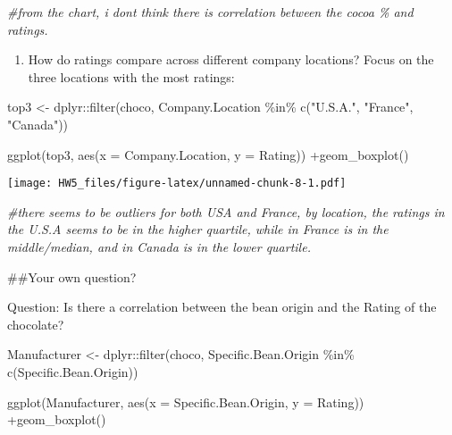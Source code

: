 \documentclass[
]{article}
\newenvironment{Shaded}{\begin{snugshade}}{\end{snugshade}}
\newcommand{\AttributeTok}[1]{\textcolor[rgb]{0.77,0.63,0.00}{#1}}
\newcommand{\CommentTok}[1]{\textcolor[rgb]{0.56,0.35,0.01}{\textit{#1}}}
\newcommand{\FunctionTok}[1]{\textcolor[rgb]{0.00,0.00,0.00}{#1}}
\newcommand{\NormalTok}[1]{#1}
\newcommand{\OtherTok}[1]{\textcolor[rgb]{0.56,0.35,0.01}{#1}}
\newcommand{\SpecialCharTok}[1]{\textcolor[rgb]{0.00,0.00,0.00}{#1}}
\newcommand{\StringTok}[1]{\textcolor[rgb]{0.31,0.60,0.02}{#1}}
\providecommand{\tightlist}{%
  \setlength{\itemsep}{0pt}\setlength{\parskip}{0pt}}
\begin{document}
\begin{Shaded}
\begin{Highlighting}[]
\CommentTok{\#from the chart, i dont think there is correlation between the cocoa \% and ratings. }
\end{Highlighting}
\end{Shaded}

\begin{enumerate}
\def\labelenumi{\arabic{enumi}.}
\setcounter{enumi}{2}
\tightlist
\item
  How do ratings compare across different company locations? Focus on
  the three locations with the most ratings:
\end{enumerate}

\begin{Shaded}
\begin{Highlighting}[]
\NormalTok{top3 }\OtherTok{\textless{}{-}}\NormalTok{ dplyr}\SpecialCharTok{::}\FunctionTok{filter}\NormalTok{(choco, Company.Location }\SpecialCharTok{\%in\%} \FunctionTok{c}\NormalTok{(}\StringTok{"U.S.A."}\NormalTok{, }\StringTok{"France"}\NormalTok{, }\StringTok{"Canada"}\NormalTok{))}

\FunctionTok{ggplot}\NormalTok{(top3, }\FunctionTok{aes}\NormalTok{(}\AttributeTok{x =}\NormalTok{ Company.Location, }\AttributeTok{y =}\NormalTok{ Rating)) }\SpecialCharTok{+}\FunctionTok{geom\_boxplot}\NormalTok{()}
\end{Highlighting}
\end{Shaded}

\texttt{[image: HW5\_files/figure-latex/unnamed-chunk-8-1.pdf]}

\begin{Shaded}
\begin{Highlighting}[]
\CommentTok{\#there seems to be outliers for both USA and France, by location, the ratings in the U.S.A seems to be in the higher quartile, while in France is in the middle/median, and in Canada is in the lower quartile.  }
\end{Highlighting}
\end{Shaded}

\#\#Your own question?

Question: Is there a correlation between the bean origin and the Rating
of the chocolate?

\begin{Shaded}
\begin{Highlighting}[]
\NormalTok{Manufacturer }\OtherTok{\textless{}{-}}\NormalTok{ dplyr}\SpecialCharTok{::}\FunctionTok{filter}\NormalTok{(choco, Specific.Bean.Origin }\SpecialCharTok{\%in\%} \FunctionTok{c}\NormalTok{(Specific.Bean.Origin))}

\FunctionTok{ggplot}\NormalTok{(Manufacturer, }\FunctionTok{aes}\NormalTok{(}\AttributeTok{x =}\NormalTok{ Specific.Bean.Origin, }\AttributeTok{y =}\NormalTok{ Rating)) }\SpecialCharTok{+}\FunctionTok{geom\_boxplot}\NormalTok{() }
\end{Highlighting}
\end{Shaded}
\end{document}

